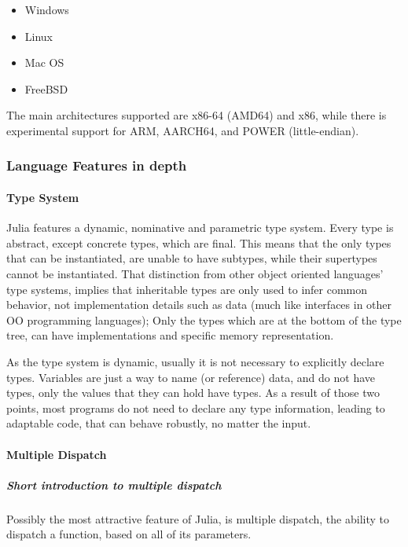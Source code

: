 \documentclass[]{article}
\providecommand{\tightlist}{%
  \setlength{\itemsep}{0pt}\setlength{\parskip}{0pt}}
\let\oldparagraph\paragraph
\renewcommand{\paragraph}[1]{\oldparagraph{#1}\mbox{}}
\let\oldsubparagraph\subparagraph
\renewcommand{\subparagraph}[1]{\oldsubparagraph{#1}\mbox{}}
\begin{document}
\begin{itemize}
\tightlist
\item
  Windows
\item
  Linux
\item
  Mac OS
\item
  FreeBSD
\end{itemize}

The main architectures supported are x86-64 (AMD64) and x86, while there
is experimental support for ARM, AARCH64, and POWER (little-endian).

\subsubsection{Language Features in
depth}\label{language-features-in-depth}

\paragraph{Type System}\label{type-system}

Julia features a dynamic, nominative and parametric type system. Every
type is abstract, except concrete types, which are final. This means
that the only types that can be instantiated, are unable to have
subtypes, while their supertypes cannot be instantiated. That
distinction from other object oriented languages' type systems, implies
that inheritable types are only used to infer common behavior, not
implementation details such as data (much like interfaces in other OO
programming languages); Only the types which are at the bottom of the
type tree, can have implementations and specific memory representation.

As the type system is dynamic, usually it is not necessary to explicitly
declare types. Variables are just a way to name (or reference) data, and
do not have types, only the values that they can hold have types. As a
result of those two points, most programs do not need to declare any
type information, leading to adaptable code, that can behave robustly,
no matter the input.

\paragraph{Multiple Dispatch}\label{multiple-dispatch}

\subparagraph{Short introduction to multiple
dispatch}\label{short-introduction-to-multiple-dispatch}

Possibly the most attractive feature of Julia, is multiple dispatch, the
ability to dispatch a function, based on all of its parameters.
\end{document}
